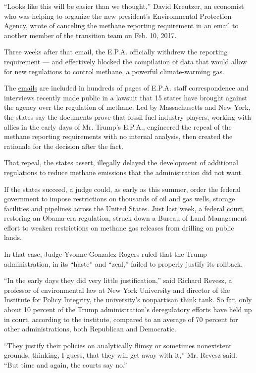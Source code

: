 ``Looks like this will be easier than we thought,'' David Kreutzer, an
economist who was helping to organize the new president's Environmental
Protection Agency, wrote of canceling the methane reporting requirement
in an email to another member of the transition team on Feb. 10, 2017.

Three weeks after that email, the E.P.A. officially withdrew the
reporting requirement --- and effectively blocked the compilation of
data that would allow for new regulations to control methane, a powerful
climate-warming gas.

The
\href{https://int.graylady3jvrrxbe.onion/data/documenttools/methane-ic-remails/a16ae11accccfb2c/full.pdf}{emails}
are included in hundreds of pages of E.P.A. staff correspondence and
interviews recently made public in a lawsuit that 15 states have brought
against the agency over the regulation of methane. Led by Massachusetts
and New York, the states say the documents prove that fossil fuel
industry players, working with allies in the early days of Mr. Trump's
E.P.A., engineered the repeal of the methane reporting requirements with
no internal analysis, then created the rationale for the decision after
the fact.

That repeal, the states assert, illegally delayed the development of
additional regulations to reduce methane emissions that the
administration did not want.

If the states succeed, a judge could, as early as this summer, order the
federal government to impose restrictions on thousands of oil and gas
wells, storage facilities and pipelines across the United States. Just
last week, a federal court, restoring an Obama-era regulation, struck
down a Bureau of Land Management effort to weaken restrictions on
methane gas releases from drilling on public lands.

In that case, Judge Yvonne Gonzalez Rogers ruled that the Trump
administration, in its ``haste'' and ``zeal,'' failed to properly
justify its rollback.

``In the early days they did very little justification,'' said Richard
Revesz, a professor of environmental law at New York University and
director of the Institute for Policy Integrity, the university's
nonpartisan think tank. So far, only about 10 percent of the Trump
administration's deregulatory efforts have held up in court, according
to the institute, compared to an average of 70 percent for other
administrations, both Republican and Democratic.

``They justify their policies on analytically flimsy or sometimes
nonexistent grounds, thinking, I guess, that they will get away with
it,'' Mr. Revesz said. ``But time and again, the courts say no.''

